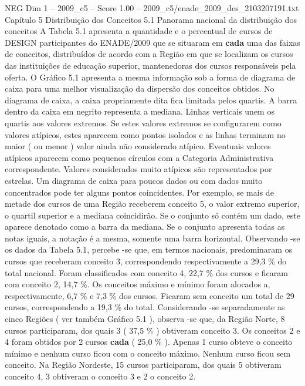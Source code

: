 \begin{textsample}{NEG Dim 1 – 2009\_c5 – Score 1.00 – 2009\_c5/enade\_2009\_des\_2103207191.txt}  \label{ex:f1_neg_293}
Capítulo 5 Distribuição dos Conceitos 5.1 Panorama nacional da distribuição dos conceitos A Tabela 5.1 apresenta a quantidade e o percentual de cursos de DESIGN participantes do ENADE/2009 que se situaram em \textbf{cada} uma das faixas de conceitos, distribuídos de acordo com a Região em que se localizam os cursos das instituições de educação superior, mantenedoras dos cursos responsáveis pela oferta.
O Gráfico 5.1 apresenta a mesma informação sob a forma de diagrama de caixa para uma melhor visualização da dispersão dos conceitos obtidos.
No diagrama de caixa, a caixa propriamente dita fica limitada pelos quartis.
A barra dentro da caixa em negrito representa a mediana.
Linhas verticais unem os quartis aos valores extremos.
Se estes valores extremos se configurarem como valores atípicos, estes aparecem como pontos isolados e as linhas terminam no maior ( ou menor ) valor ainda não considerado atípico.
Eventuais valores atípicos aparecem como pequenos círculos com a Categoria Administrativa correspondente.
Valores considerados muito atípicos são representados por estrelas.
Um diagrama de caixa para poucos dados ou com dados muito concentrados pode ter alguns pontos coincidentes.
Por exemplo, se mais de metade dos cursos de uma Região receberem conceito 5, o valor extremo superior, o quartil superior e a mediana coincidirão.
Se o conjunto só contém um dado, este aparece denotado como a barra da mediana.
Se o conjunto apresenta todas as notas iguais, a notação é a mesma, somente uma barra horizontal.
Observando -se os dados da Tabela 5.1, percebe -se que, em termos nacionais, predominaram os cursos que receberam conceito 3, correspondendo respectivamente a 29,3 \% do total nacional.
Foram classificados com conceito 4, 22,7 \% dos cursos e ficaram com conceito 2, 14,7 \%.
Os conceitos máximo e mínimo foram alocados a, respectivamente, 6,7 \% e 7,3 \% dos cursos.
Ficaram sem conceito um total de 29 cursos, correspondendo a 19,3 \% do total.
Considerando -se separadamente as cinco Regiões ( ver também Gráfico 5.1 ), observa -se que, da Região Norte, 8 cursos participaram, dos quais 3 ( 37,5 \% ) obtiveram conceito 3.
Os conceitos 2 e 4 foram obtidos por 2 cursos \textbf{cada} ( 25,0 \% ).
Apenas 1 curso obteve o conceito mínimo e nenhum curso ficou com o conceito máximo.
Nenhum curso ficou sem conceito.
Na Região Nordeste, 15 cursos participaram, dos quais 5 obtiveram conceito 4, 3 obtiveram o conceito 3 e 2 o conceito 2.

\end{textsample}
